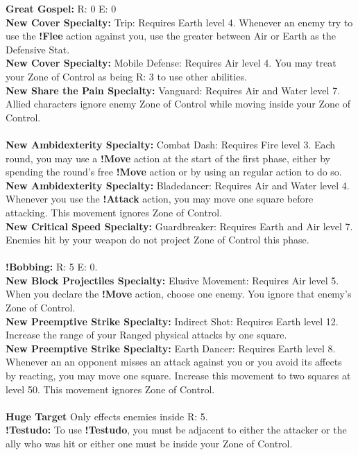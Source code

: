 \textbf{Great Gospel:} R: 0 E: 0\\
\textbf{New Cover Specialty:} Trip: Requires Earth level 4. Whenever an enemy try to use the \textbf{!Flee} action against you, use the greater between Air or Earth as the Defensive Stat.\\
\textbf{New Cover Specialty:} Mobile Defense: Requires Air level 4. You may treat your Zone of Control as being R: 3 to use other abilities.\\
\textbf{New Share the Pain Specialty:} Vanguard: Requires Air and Water level 7. Allied characters ignore enemy Zone of Control while moving inside your Zone of Control.
%
\\\\
%
 \ofrow
\textbf{New Ambidexterity Specialty:} Combat Dash: Requires Fire level 3. Each round, you may use a \textbf{!Move} action at the start of the first phase, either by spending the round’s free \textbf{!Move} action or by using an regular action to do so.\\ 
\textbf{New Ambidexterity Specialty:} Bladedancer: Requires Air and Water level 4. Whenever you use the \textbf{!Attack} action, you may move one square before attacking. This movement ignores Zone of Control.\\ 
\textbf{New Critical Speed Specialty:} Guardbreaker: Requires Earth and Air level 7. Enemies hit by your weapon do not project Zone of Control this phase.
%
\\\\
%
 \ofrow
\textbf{!Bobbing:} R: 5 E: 0.\\
\textbf{New Block Projectiles Specialty:} Elusive Movement: Requires Air level 5. When you declare the \textbf{!Move} action, choose one enemy. You ignore that enemy’s Zone of Control.\\
\textbf{New Preemptive Strike Specialty:} Indirect Shot: Requires Earth level 12. Increase the range of your Ranged physical attacks by one square.\\
\textbf{New Preemptive Strike Specialty:} Earth Dancer: Requires Earth level 8. Whenever an an opponent misses an attack against you or you avoid its affects by reacting, you may move one square. Increase this movement to two squares at level 50. This movement ignores Zone of Control.
%
\\\\
%
 \ofrow
\textbf{Huge Target} Only effects enemies inside R: 5.\\
\textbf{!Testudo:} To use \textbf{!Testudo}, you must be adjacent to either the attacker or the ally who was hit or either one must be inside your Zone of Control.\\
